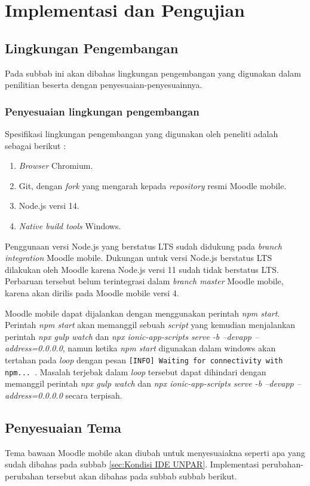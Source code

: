 \chapter{Implementasi dan Pengujian}

\section{Lingkungan Pengembangan}
Pada subbab ini akan dibahas lingkungan pengembangan yang digunakan dalam penilitian beserta dengan penyesuaian-penyesuainnya.
\subsection{Penyesuaian lingkungan pengembangan}
Spesifikasi lingkungan pengembangan yang digunakan oleh peneliti adalah sebagai berikut :

\begin{enumerate}
	\item \textit{Browser} Chromium.
	\item Git, dengan \textit{fork} yang mengarah kepada \textit{repository} resmi Moodle mobile.
	\item Node.js versi 14.
	\item \textit{Native build tools} Windows.
\end{enumerate} 

Penggunaan versi Node.js yang berstatus LTS sudah didukung pada \textit{branch integration} Moodle mobile. Dukungan untuk versi Node.js berstatus LTS dilakukan oleh Moodle karena Node.js versi 11 sudah tidak berstatus LTS. Perbaruan tersebut belum terintegrasi dalam \textit{branch master} Moodle mobile, karena akan dirilis pada Moodle mobile versi 4. \cite{MoodleTracker:Node11+} 

Moodle mobile dapat dijalankan dengan menggunakan perintah \textit{npm start}.  Perintah \textit{npm start} akan memanggil sebuah \textit{script} yang kemudian menjalankan perintah \textit{npx gulp watch} dan \textit{npx ionic-app-scripts serve -b --devapp --address=0.0.0.0}, namun ketika \textit{npm start} digunakan dalam windows akan tertahan pada \textit{loop} dengan pesan \texttt{[INFO] Waiting for connectivity with npm...	}. Masalah terjebak dalam \textit{loop} tersebut dapat dihindari dengan memanggil perintah \textit{npx gulp watch} dan \textit{npx ionic-app-scripts serve -b --devapp --address=0.0.0.0} secara terpisah. 


\section{Penyesuaian Tema}
Tema bawaan Moodle mobile akan diubah untuk menyesuaiakna seperti apa yang sudah dibahas pada subbab \ref{sec:Kondisi IDE UNPAR}. Implementasi perubahan-perubahan tersebut akan dibahas pada subbab subbab berikut.

